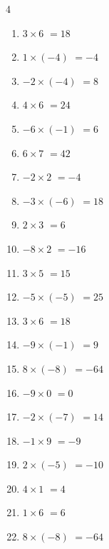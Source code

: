 \begin{multicols}{4}
\begin{enumerate}
  \item $3\times 6$
        $=18$

  \item $1\times (-4)$
        $=-4$

  \item $-2\times (-4)$
        $=8$

  \item $4\times 6$
        $=24$

  \item $-6\times (-1)$
        $=6$

  \item $6\times 7$
        $=42$

  \item $-2\times 2$
        $=-4$

  \item $-3\times (-6)$
        $=18$

  \item $2\times 3$
        $=6$

  \item $-8\times 2$
        $=-16$

  \item $3\times 5$
        $=15$

\columnbreak %

  \item $-5\times (-5)$
        $=25$

  \item $3\times 6$
        $=18$

  \item $-9\times (-1)$
        $=9$

  \item $8\times (-8)$
        $=-64$

  \item $-9\times 0$
        $=0$

  \item $-2\times (-7)$
        $=14$

  \item $-1\times 9$
        $=-9$

  \item $2\times (-5)$
        $=-10$

  \item $4\times 1$
        $=4$

  \item $1\times 6$
        $=6$

  \item $8\times (-8)$
        $=-64$


\end{enumerate}
\end{multicols}

